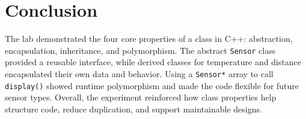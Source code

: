 \section{Conclusion}

The lab demonstrated the four core properties of a class in C++: abstraction, encapsulation, inheritance, and polymorphism. The abstract \texttt{Sensor} class provided a reusable interface, while derived classes for temperature and distance encapsulated their own data and behavior. Using a \texttt{Sensor*} array to call \texttt{display()} showed runtime polymorphism and made the code flexible for future sensor types. Overall, the experiment reinforced how class properties help structure code, reduce duplication, and support maintainable designs.

